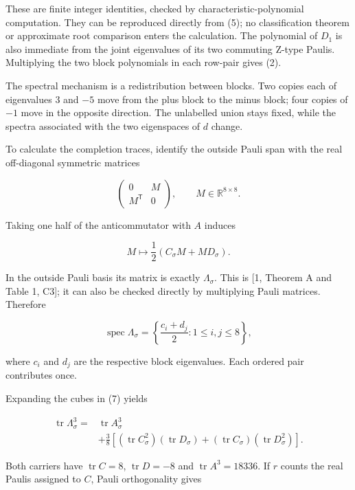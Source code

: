 \documentclass[11pt,letterpaper]{article}
\begin{document}
These are finite integer identities, checked by characteristic-polynomial computation. They can be reproduced directly from (5); no classification theorem or approximate root comparison enters the calculation. The polynomial of \(D_1\) is also immediate from the joint eigenvalues of its two commuting Z-type Paulis. Multiplying the two block polynomials in each row-pair gives (2).

The spectral mechanism is a redistribution between blocks. Two copies each of eigenvalues \(3\) and \(-5\) move from the plus block to the minus block; four copies of \(-1\) move in the opposite direction. The unlabelled union stays fixed, while the spectra associated with the two eigenspaces of \(d\) change.

To calculate the completion traces, identify the outside Pauli span with the real off-diagonal symmetric matrices

\[\begin{pmatrix}0&M\\M^{\mathsf T}&0\end{pmatrix},
\qquad M\in\mathbb R^{8\times8}.\]

Taking one half of the anticommutator with \(A\) induces

\[M\longmapsto \frac12(C_\sigma M+M D_\sigma).
\tag{6}\]

In the outside Pauli basis its matrix is exactly \(\Lambda_\sigma\). This is {[}1, Theorem A and Table 1, C3{]}; it can also be checked directly by multiplying Pauli matrices. Therefore

\[\operatorname{spec}\Lambda_\sigma
=\left\{\frac{c_i+d_j}{2}:1\le i,j\le8\right\},
\tag{7}\]

where \(c_i\) and \(d_j\) are the respective block eigenvalues. Each ordered pair contributes once.

Expanding the cubes in (7) yields

\[\begin{aligned}
\operatorname{tr}\Lambda_\sigma^3
={}&\operatorname{tr}A_\sigma^3\\
&+\frac38\left[
(\operatorname{tr}C_\sigma^2)(\operatorname{tr}D_\sigma)
+(\operatorname{tr}C_\sigma)(\operatorname{tr}D_\sigma^2)
\right].
\end{aligned}
\tag{8}\]

Both carriers have \(\operatorname{tr}C=8\), \(\operatorname{tr}D=-8\) and \(\operatorname{tr}A^3=18336\). If \(r\) counts the real Paulis assigned to \(C\), Pauli orthogonality gives
\end{document}
